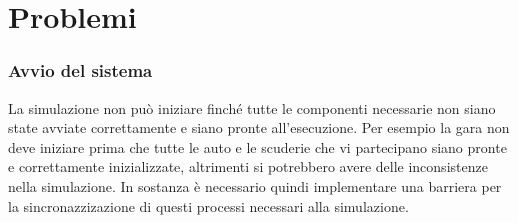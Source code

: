 \documentclass[11pt,a4paper]{report}
\begin{document}





\chapter{Problemi}
\subsection*{Avvio del sistema}
La simulazione non può iniziare finché tutte le componenti necessarie non siano state avviate correttamente e siano pronte all'esecuzione. Per esempio la gara non deve iniziare prima che tutte le auto e le scuderie che vi partecipano siano pronte e correttamente inizializzate, altrimenti si potrebbero avere delle inconsistenze nella simulazione. In sostanza è necessario quindi implementare una barriera per la sincronazzizazione di questi processi necessari alla simulazione.
\end{document}
